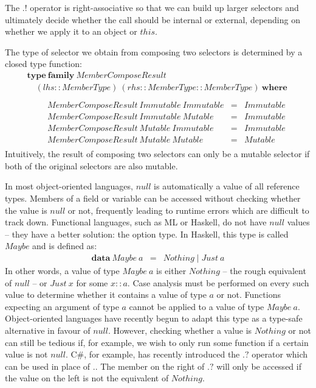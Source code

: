 The $.!$ operator is right-associative so that we can build up larger selectors and ultimately decide whether the call should be internal or external, depending on whether we apply it to an object or $\mathit{this}$.

The type of selector we obtain from composing two selectors is determined by a closed type function:
\begin{displaymath}
\begin{array}{l}
\mathbf{type}~\mathbf{family}~\mathit{MemberComposeResult} \\
\quad (\mathit{lhs} :: \mathit{MemberType})~(\mathit{rhs} :: \mathit{MemberType} :: \mathit{MemberType})~\mathbf{where} \\\\
\qquad \begin{array}{lcl}
\mathit{MemberComposeResult}~\mathit{Immutable}~\mathit{Immutable} & = & \mathit{Immutable} \\
\mathit{MemberComposeResult}~\mathit{Immutable}~\mathit{Mutable} & = & \mathit{Immutable} \\
\mathit{MemberComposeResult}~\mathit{Mutable}~\mathit{Immutable} & = & \mathit{Immutable} \\
\mathit{MemberComposeResult}~\mathit{Mutable}~\mathit{Mutable} & = & \mathit{Mutable} 
\end{array}
\end{array}
\end{displaymath}
Intuitively, the result of composing two selectors can only be a mutable selector if both of the original selectors are also mutable. 

In most object-oriented languages, $\mathit{null}$ is automatically a value of all reference types. Members of a field or variable can be accessed without checking whether the value is $\mathit{null}$ or not, frequently leading to runtime errors which are difficult to track down. Functional languages, such as ML or Haskell, do not have $\mathit{null}$ values -- they have a better solution: the option type. In Haskell, this type is called $\mathit{Maybe}$ and is defined as:
\begin{displaymath}
\begin{array}{lcl}
\mathbf{data}~\mathit{Maybe}~a & = & \mathit{Nothing} \mid \mathit{Just}~a
\end{array}
\end{displaymath}
In other words, a value of type $\mathit{Maybe}~a$ is either $\mathit{Nothing}$ -- the rough equivalent of $\mathit{null}$ -- or $\mathit{Just}~x$ for some $x :: a$. Case analysis must be performed on every such value to determine whether it contains a value of type $a$ or not. Functions expecting an argument of type $a$ cannot be applied to a value of type $\mathit{Maybe}~a$. Object-oriented languages have recently begun to adapt this type as a type-safe alternative in favour of $\mathit{null}$. However, checking whether a value is $\mathit{Nothing}$ or not can still be tedious if, for example, we wish to only run some function if a certain value is not $\mathit{null}$. C\#, for example, has recently introduced the $.?$ operator which can be used in place of $.$. The member on the right of $.?$ will only be accessed if the value on the left is not the equivalent of $\mathit{Nothing}$.

